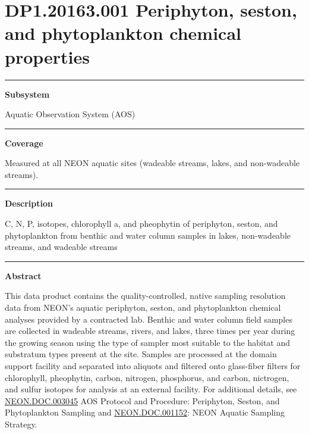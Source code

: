 \documentclass[]{article}
\begin{document}
\section{DP1.20163.001 Periphyton, seston, and phytoplankton chemical
properties}\label{dp1.20163.001-periphyton-seston-and-phytoplankton-chemical-properties}

\begin{center}\rule{0.5\linewidth}{\linethickness}\end{center}

\textbf{Subsystem}

Aquatic Observation System (AOS)

\begin{center}\rule{0.5\linewidth}{\linethickness}\end{center}

\textbf{Coverage}

Measured at all NEON aquatic sites (wadeable streams, lakes, and
non-wadeable streams).

\begin{center}\rule{0.5\linewidth}{\linethickness}\end{center}

\textbf{Description}

C, N, P, isotopes, chlorophyll a, and pheophytin of periphyton, seston,
and phytoplankton from benthic and water column samples in lakes,
non-wadeable streams, and wadeable streams

\begin{center}\rule{0.5\linewidth}{\linethickness}\end{center}

\textbf{Abstract}

This data product contains the quality-controlled, native sampling
resolution data from NEON's aquatic periphyton, seston, and
phytoplankton chemical analyses provided by a contracted lab. Benthic
and water column field samples are collected in wadeable streams,
rivers, and lakes, three times per year during the growing season using
the type of sampler most suitable to the habitat and substratum types
present at the site. Samples are processed at the domain support
facility and separated into aliquots and filtered onto glass-fiber
filters for chlorophyll, pheophytin, carbon, nitrogen, phosphorus, and
carbon, nictrogen, and sulfur isotopes for analysis at an external
facility. For additional details, see
\href{http://data.neonscience.org/api/v0/documents/NEON.DOC.003045vB}{NEON.DOC.003045}
AOS Protocol and Procedure: Periphyton, Seston, and Phytoplankton
Sampling and
\href{http://data.neonscience.org/api/v0/documents/NEON.DOC.001152vA}{NEON.DOC.001152}:
NEON Aquatic Sampling Strategy.
\end{document}
